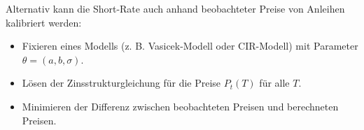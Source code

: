 \begin{QandA}
\begin{answered}
        Alternativ kann die Short-Rate auch anhand beobachteter Preise von Anleihen kalibriert werden:
        \begin{itemize}
            \item Fixieren eines Modells (z. B. Vasicek-Modell oder CIR-Modell) mit Parameter $\theta = (a, b, \sigma)$.
            \item Lösen der Zinsstrukturgleichung für die Preise $P_t(T)$ für alle $T$.
            \item Minimieren der Differenz zwischen beobachteten Preisen und berechneten Preisen.
        \end{itemize}
    \end{answered}
\end{QandA}